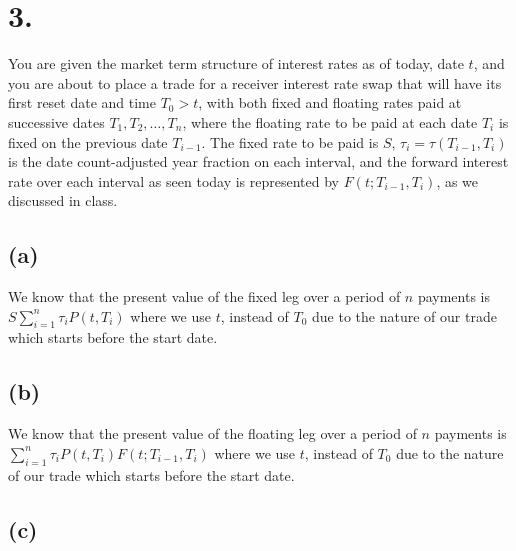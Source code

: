 \documentclass{article}
\begin{document}
\section*{3.}
{\Large 

You are given the market term structure of interest rates as of today, date $t$, and you are about to place a trade for a receiver interest rate swap that will have its first reset date and time $T_0 > t$, with both fixed and floating rates paid at successive dates $T_1, T_2, \dots, T_n$, where the floating rate to be paid at each date $T_i$ is fixed on the previous date $T_{i-1}$. The fixed rate to be paid is $S$, $\tau_i = \tau(T_{i-1}, T_i)$ is the date count-adjusted year fraction on each interval, and the forward interest rate over each interval as seen today is represented by $F(t; T_{i-1}, T_i)$, as we discussed in class.

\subsection*{(a)}

We know that the present value of the fixed leg over a period of $n$ payments is $S\sum_{i=1}^{n} \tau_i P(t, T_i)$ where we use $t$, instead of $T_0$ due to the nature of our trade which starts before the start date. 

\subsection*{(b)}

We know that the present value of the floating leg over a period of $n$ payments is $\sum_{i=1}^{n} \tau_i P(t, T_i)F(t; T_{i-1}, T_i)$ where we use $t$, instead of $T_0$ due to the nature of our trade which starts before the start date. 

\subsection*{(c)}

}
\end{document}
